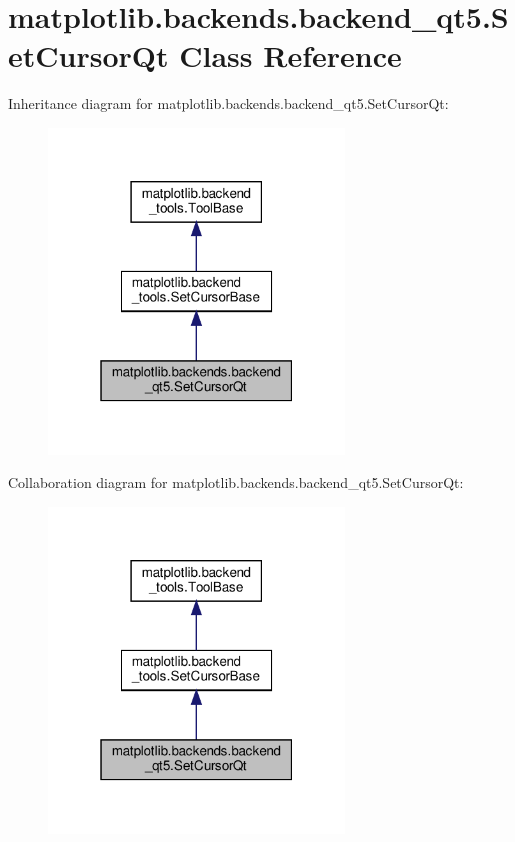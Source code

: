 \hypertarget{classmatplotlib_1_1backends_1_1backend__qt5_1_1SetCursorQt}{}\section{matplotlib.\+backends.\+backend\+\_\+qt5.\+Set\+Cursor\+Qt Class Reference}
\label{classmatplotlib_1_1backends_1_1backend__qt5_1_1SetCursorQt}


Inheritance diagram for matplotlib.\+backends.\+backend\+\_\+qt5.\+Set\+Cursor\+Qt\+:
\nopagebreak
\begin{figure}[H]
\begin{center}
\leavevmode
\includegraphics[width=223pt]{classmatplotlib_1_1backends_1_1backend__qt5_1_1SetCursorQt__inherit__graph}
\end{center}
\end{figure}


Collaboration diagram for matplotlib.\+backends.\+backend\+\_\+qt5.\+Set\+Cursor\+Qt\+:
\nopagebreak
\begin{figure}[H]
\begin{center}
\leavevmode
\includegraphics[width=223pt]{classmatplotlib_1_1backends_1_1backend__qt5_1_1SetCursorQt__coll__graph}
\end{center}
\end{figure}
